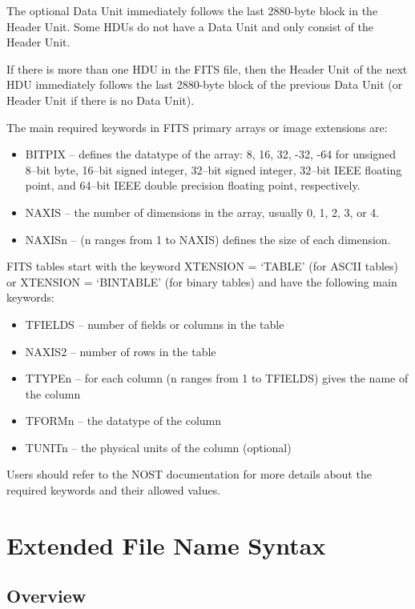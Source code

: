 \documentclass[11pt]{book}
\begin{document}
The optional Data Unit immediately follows the last 2880-byte block in
the Header Unit.  Some HDUs do not have a Data Unit and only consist of
the Header Unit.

If there is more than one HDU in the FITS file, then the Header Unit of
the next HDU immediately follows the last 2880-byte block of the
previous Data Unit (or Header Unit if there is no Data Unit).

The main required keywords in FITS primary arrays or image extensions are:
\begin{itemize}
\item
BITPIX -- defines the datatype of the array: 8, 16, 32, -32, -64 for
unsigned 8--bit byte, 16--bit signed integer, 32--bit signed integer,
32--bit IEEE floating point, and 64--bit IEEE double precision floating
point, respectively.
\item
NAXIS --  the number of dimensions in the array, usually 0, 1, 2, 3, or 4.
\item
NAXISn -- (n ranges from 1 to NAXIS) defines the size of each dimension.
\end{itemize}

FITS tables start with the keyword XTENSION = `TABLE' (for ASCII
tables) or XTENSION = `BINTABLE' (for binary tables) and have the
following main keywords:
\begin{itemize}
\item
TFIELDS -- number of fields or columns in the table
\item
NAXIS2 -- number of rows in the table
\item
TTYPEn -- for each column (n ranges from 1 to TFIELDS) gives the
name of the column
\item
TFORMn -- the datatype of the column
\item
TUNITn -- the physical units of the column (optional)
\end{itemize}

Users should refer to the NOST documentation for more details about the
required keywords and their allowed values.


\chapter{  Extended File Name Syntax }


\section{Overview}
\end{document}

